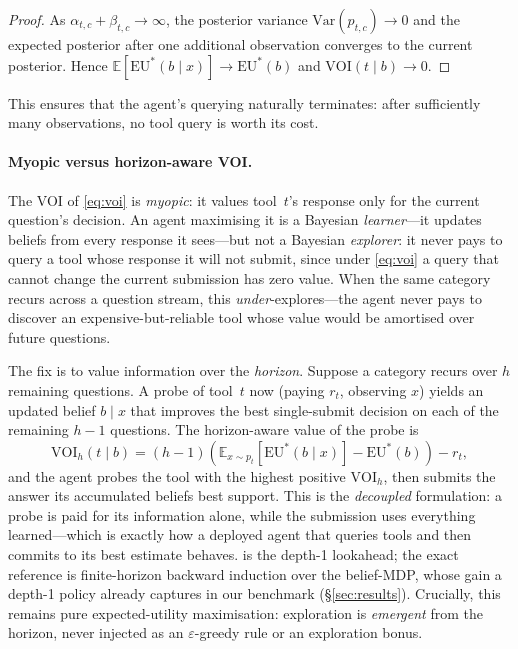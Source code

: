 \documentclass[11pt]{article}
\newcommand{\EU}{\mathrm{EU}}
\newcommand{\VOI}{\mathrm{VOI}}
\newcommand{\E}{\mathbb{E}}
\begin{document}
\begin{proof}
As $\alpha_{t,c} + \beta_{t,c} \to \infty$, the posterior variance $\mathrm{Var}(p_{t,c}) \to 0$ and the expected posterior after one additional observation converges to the current posterior. Hence $\E[\EU^*(b \mid x)] \to \EU^*(b)$ and $\VOI(t \mid b) \to 0$.
\end{proof}

This ensures that the agent's querying naturally terminates: after sufficiently many observations, no tool query is worth its cost.

\paragraph{Myopic versus horizon-aware VOI.}
The VOI of \cref{eq:voi} is \emph{myopic}: it values tool~$t$'s response only for the current question's decision. An agent maximising it is a Bayesian \emph{learner}---it updates beliefs from every response it sees---but not a Bayesian \emph{explorer}: it never pays to query a tool whose response it will not submit, since under \cref{eq:voi} a query that cannot change the current submission has zero value. When the same category recurs across a question stream, this \emph{under}-explores---the agent never pays to discover an expensive-but-reliable tool whose value would be amortised over future questions.

The fix is to value information over the \emph{horizon}. Suppose a category recurs over $h$ remaining questions. A probe of tool~$t$ now (paying $r_t$, observing $x$) yields an updated belief $b \mid x$ that improves the best single-submit decision on each of the remaining $h-1$ questions. The horizon-aware value of the probe is
\begin{equation}
  \VOI_h(t \mid b) = (h-1)\left(\E_{x \sim p_t}[\EU^*(b \mid x)] - \EU^*(b)\right) - r_t,
  \label{eq:voi_horizon}
\end{equation}
and the agent probes the tool with the highest positive $\VOI_h$, then submits the answer its accumulated beliefs best support. This is the \emph{decoupled} formulation: a probe is paid for its information alone, while the submission uses everything learned---which is exactly how a deployed agent that queries tools and then commits to its best estimate behaves.  is the depth-1 lookahead; the exact reference is finite-horizon backward induction over the belief-MDP, whose gain a depth-1 policy already captures in our benchmark (\S\ref{sec:results}). Crucially, this remains pure expected-utility maximisation: exploration is \emph{emergent} from the horizon, never injected as an $\varepsilon$-greedy rule or an exploration bonus.
\end{document}
